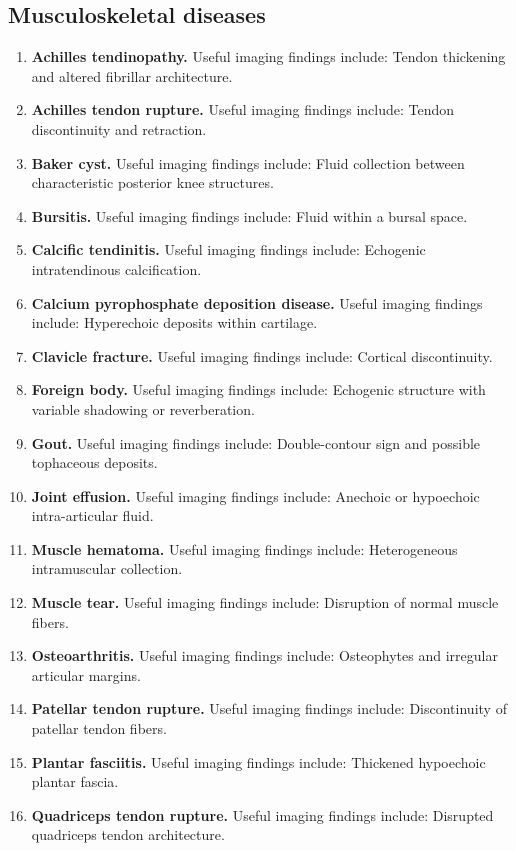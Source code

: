 \subsection{Musculoskeletal diseases}
\begin{enumerate}[leftmargin=*,itemsep=0.45em,topsep=0.4em]
\item \textbf{Achilles tendinopathy.} Useful imaging findings include: Tendon thickening and altered fibrillar architecture.
\item \textbf{Achilles tendon rupture.} Useful imaging findings include: Tendon discontinuity and retraction.
\item \textbf{Baker cyst.} Useful imaging findings include: Fluid collection between characteristic posterior knee structures.
\item \textbf{Bursitis.} Useful imaging findings include: Fluid within a bursal space.
\item \textbf{Calcific tendinitis.} Useful imaging findings include: Echogenic intratendinous calcification.
\item \textbf{Calcium pyrophosphate deposition disease.} Useful imaging findings include: Hyperechoic deposits within cartilage.
\item \textbf{Clavicle fracture.} Useful imaging findings include: Cortical discontinuity.
\item \textbf{Foreign body.} Useful imaging findings include: Echogenic structure with variable shadowing or reverberation.
\item \textbf{Gout.} Useful imaging findings include: Double-contour sign and possible tophaceous deposits.
\item \textbf{Joint effusion.} Useful imaging findings include: Anechoic or hypoechoic intra-articular fluid.
\item \textbf{Muscle hematoma.} Useful imaging findings include: Heterogeneous intramuscular collection.
\item \textbf{Muscle tear.} Useful imaging findings include: Disruption of normal muscle fibers.
\item \textbf{Osteoarthritis.} Useful imaging findings include: Osteophytes and irregular articular margins.
\item \textbf{Patellar tendon rupture.} Useful imaging findings include: Discontinuity of patellar tendon fibers.
\item \textbf{Plantar fasciitis.} Useful imaging findings include: Thickened hypoechoic plantar fascia.
\item \textbf{Quadriceps tendon rupture.} Useful imaging findings include: Disrupted quadriceps tendon architecture.

\end{enumerate}

